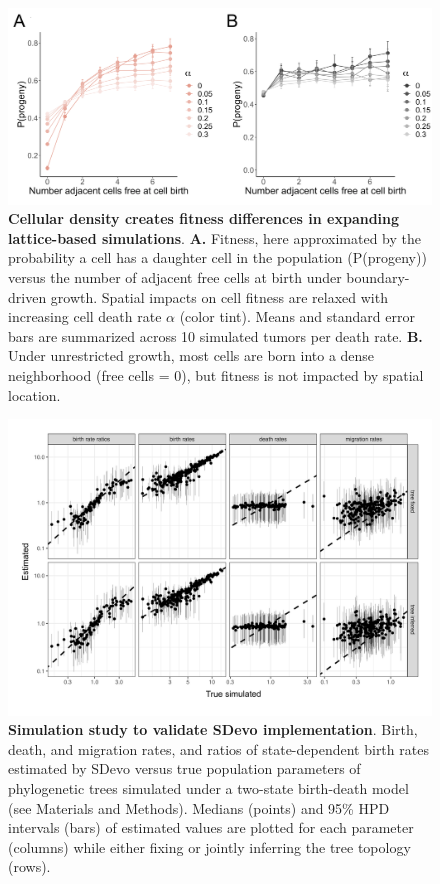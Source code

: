 \documentclass[12pt]{elife_based}
\begin{document}
\begin{figure}
\includegraphics[width=\textwidth]{figures/fig1_supp.pdf}
\caption{\textbf{Cellular density creates fitness differences in expanding lattice-based simulations}. \textbf{A.} Fitness, here approximated by the probability a cell has a daughter cell in the population (P(progeny)) versus the number of adjacent free cells at birth under boundary-driven growth. Spatial impacts on cell fitness are relaxed with increasing cell death rate $\alpha$ (color tint). Means and standard error bars are summarized across 10 simulated tumors per death rate. \textbf{B.} Under unrestricted growth, most cells are born into a dense neighborhood (free cells = 0), but fitness is not impacted by spatial location.}
\label{figsupp:sf1}
\end{figure}

\begin{figure}
    \includegraphics[width=\textwidth]{figures/figure_3_supp_validation_study.pdf}
    \caption{\textbf{Simulation study to validate SDevo implementation}. Birth, death, and migration rates, and ratios of state-dependent birth rates estimated by SDevo versus true population parameters of phylogenetic trees simulated under a two-state birth-death model (see Materials and Methods). Medians (points) and 95\% HPD intervals (bars) of estimated values are plotted for each parameter (columns) while either fixing or jointly inferring the tree topology (rows).}
\label{figsupp:SDevo_validation}
\end{figure} 
\end{document}
